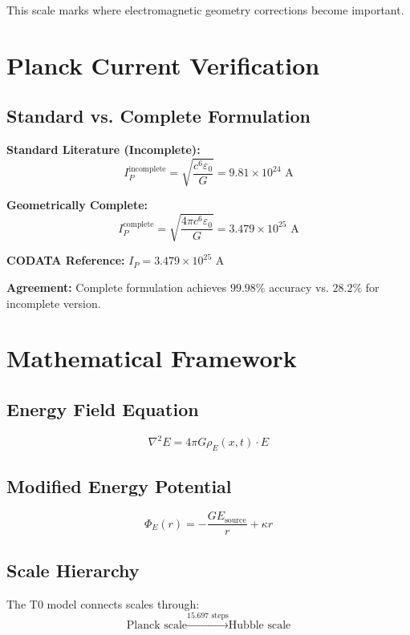 \documentclass[12pt,a4paper]{article}
\begin{document}
	This scale marks where electromagnetic geometry corrections become important.
	
	\section{Planck Current Verification}
	
	\subsection{Standard vs. Complete Formulation}
	\textbf{Standard Literature (Incomplete):}
	\begin{equation}
		I_P^{\text{incomplete}} = \sqrt{\frac{c^6\varepsilon_0}{G}} = 9.81 \times 10^{24} \text{ A}
	\end{equation}
	
	\textbf{Geometrically Complete:}
	\begin{equation}
		I_P^{\text{complete}} = \sqrt{\frac{4\pi c^6\varepsilon_0}{G}} = 3.479 \times 10^{25} \text{ A}
	\end{equation}
	
	\textbf{CODATA Reference:} $I_P = 3.479 \times 10^{25}$ A
	
	\textbf{Agreement:} Complete formulation achieves $99.98\%$ accuracy vs. $28.2\%$ for incomplete version.
	
	\section{Mathematical Framework}
	
	\subsection{Energy Field Equation}
	\begin{equation}
		\nabla^2 E = 4\pi G \rho_E(x,t) \cdot E
	\end{equation}
	
	\subsection{Modified Energy Potential}
	\begin{equation}
		\Phi_E(r) = -\frac{GE_{\text{source}}}{r} + \kappa r
	\end{equation}
	
	\subsection{Scale Hierarchy}
	The T0 model connects scales through:
	\begin{equation}
		\text{Planck scale} \xrightarrow{15.697 \text{ steps}} \text{Hubble scale}
	\end{equation}
	
\end{document}
